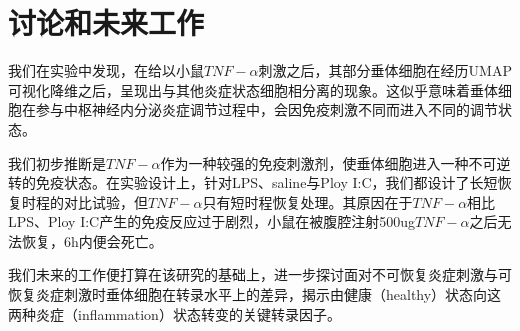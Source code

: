 \section{讨论和未来工作}
  我们在实验中发现，在给以小鼠$TNF-\alpha$刺激之后，其部分垂体细胞在经历UMAP可视化降维之后，呈现出与其他炎症状态细胞相分离的现象。这似乎意味着垂体细胞在参与中枢神经内分泌炎症调节过程中，会因免疫刺激不同而进入不同的调节状态。

  我们初步推断是$TNF-\alpha$作为一种较强的免疫刺激剂，使垂体细胞进入一种不可逆转的免疫状态。在实验设计上，针对LPS、saline与Ploy I:C，我们都设计了长短恢复时程的对比试验，但$TNF-\alpha$只有短时程恢复处理。其原因在于$TNF-\alpha$相比LPS、Ploy I:C产生的免疫反应过于剧烈，小鼠在被腹腔注射500ug$TNF-\alpha$之后无法恢复，6h内便会死亡。

  我们未来的工作便打算在该研究的基础上，进一步探讨面对不可恢复炎症刺激与可恢复炎症刺激时垂体细胞在转录水平上的差异，揭示由健康（healthy）状态向这两种炎症（inflammation）状态转变的关键转录因子。

